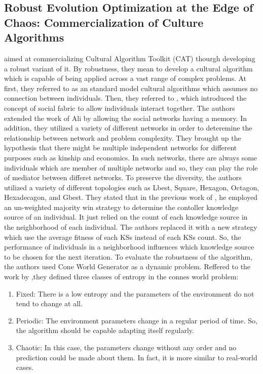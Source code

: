 \subsection{Robust Evolution Optimization at the Edge of Chaos: Commercialization of Culture Algorithms}
\citet{che2010robust} aimed at commercializing Cultural Algorithm Toolkit (CAT) thourgh developing a robust variant of it. By robustness, they mean to develop a cultural algorithm which is capable of being applied across a vast range of complex problems. At first, they referred to \citet{peng2005knowledge} as an standard model cultural algorithms which assumes no connection between individuals. Then, they referred to \citet{ali2008using}, which introduced the concept of social fabric to allow individuals interact together. The authors extended the work of Ali by allowing the social networks having a memory. In addition, they utilized a variety of different networks in order to deteremine the relationship between network and problem complexity. \newline They brought up the hypothesis that there might be multiple independent networks for different purposes such as kinship and economics. In such networks, there are always some individuals which are member of multiple networks and so, they can play the role of mediator between differet networks. To preserve the diversity, the authors utilized a variety of different topologies such as Lbest, Square, Hexagon, Octagon, Hexadecagon, and Gbest. \newline
They stated that in the previous work of \citet{ali2008using}, he employed an un-weighted majority win strategy to determine the contoller knowledge source of an individual. It just relied on the count of each knowledge source in the neighborhood of each individual. The authors replaced it with a new strategy which use the average fitness of each KSs instead of each KSs count. So, the performance of individuals in a neighborhood influences which knowledge source to be chosen for the next iteration. \newline
To evaluate the robustness of the algorithm, the authors used Cone World Generator \citet{morrison1999test} as a dynamic problem. Reffered to the work by \citet{lewin1999complexity} ,they defined three classes of entropy in the connes world problem:
\begin{enumerate}
	\item Fixed: There is a low entropy and the parameters of the environment do not tend to change at all.
	\item Periodic: The environment parameters change in a regular period of time. So, the algorithm should be capable adapting itself regularly.
	\item Chaotic: In this case, the parameters change without any order and no prediction could be made about them. In fact, it is more similar to real-world cases.
\end{enumerate}
